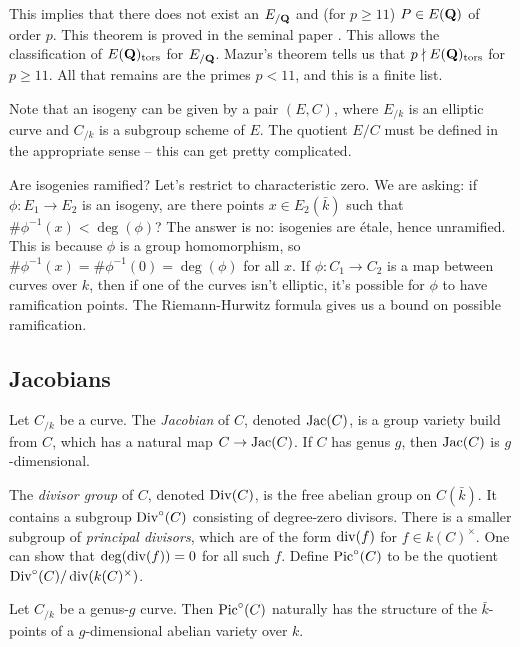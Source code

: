 This implies that there does not exist an $E_{/\mathbf{Q}}$ and (for $p\geqslant 11$) 
$P\in E(\mathbf{Q})$ of order $p$. This theorem is proved in the seminal paper 
\cite{mazur-1977}. This allows the classification of $E(\mathbf{Q})_\mathrm{tors}$ for 
$E_{/\mathbf{Q}}$. Mazur's theorem tells us that $p\nmid E(\mathbf{Q})_\mathrm{tors}$ for 
$p\geqslant 11$. All that remains are the primes $p<11$, and this is a finite 
list. 

Note that an isogeny can be given by a pair $(E,C)$, where $E_{/k}$ is an 
elliptic curve and $C_{/k}$ is a subgroup scheme of $E$. The quotient $E/C$ 
must be defined in the appropriate sense -- this can get pretty complicated. 

Are isogenies ramified? Let's restrict to characteristic zero. We are asking: 
if $\phi:E_1\to E_2$ is an isogeny, are there points $x\in E_2(\bar k)$ such 
that $\#\phi^{-1}(x)< \deg(\phi)$? The answer is no: isogenies are \'etale, 
hence unramified. This is because $\phi$ is a group homomorphism, so 
$\#\phi^{-1}(x) = \# \phi^{-1}(0) = \deg(\phi)$ for all $x$. If 
$\phi:C_1\to C_2$ is a map between curves over $k$, then if one of the curves 
isn't elliptic, it's possible for $\phi$ to have ramification points. The 
Riemann-Hurwitz formula gives us a bound on possible ramification. 





\subsection{Jacobians}

Let $C_{/k}$ be a curve. The \emph{Jacobian} of $C$, denoted $\operatorname{Jac}(C)$, 
is a group variety build from $C$, which has a natural map $C\to \operatorname{Jac}(C)$. 
If $C$ has genus $g$, then $\operatorname{Jac}(C)$ is $g$-dimensional. 

The \emph{divisor group} of $C$, denoted $\operatorname{Div}(C)$, is the free abelian 
group on $C(\bar k)$. It contains a subgroup $\operatorname{Div}^\circ(C)$ consisting 
of degree-zero divisors. There is a smaller subgroup of \emph{principal 
divisors}, which are of the form $\operatorname{div}(f)$ for $f\in k(C)^\times$. One can 
show that $\deg(\operatorname{div}(f))=0$ for all such $f$. Define 
$\operatorname{Pic}^\circ(C)$ to be the quotient 
$\operatorname{Div}^\circ(C)/\operatorname{div}(k(C)^\times)$. 

\begin{theorem}
Let $C_{/k}$ be a genus-$g$ curve. Then $\operatorname{Pic}^\circ(C)$ naturally has the 
structure of the $\bar k$-points of a $g$-dimensional abelian variety over $k$. 
\end{theorem}

